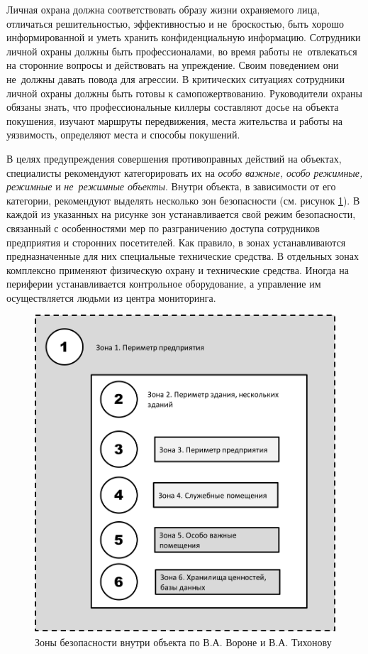 \documentclass[a4paper,12pt,fleqn]{article} %
\begin{document}
Личная охрана должна соответствовать образу жизни охраняемого лица, отличаться решительностью, эффективностью и не~броскостью, быть хорошо информированной и уметь хранить конфиденциальную информацию. Сотрудники личной охраны должны быть профессионалами, во время работы не~отвлекаться на сторонние вопросы и действовать на упреждение. Своим поведением они не~должны давать повода для агрессии. В критических ситуациях сотрудники личной охраны должны быть готовы к самопожертвованию. Руководители охраны обязаны знать, что профессиональные киллеры составляют досье на объекта покушения, изучают маршруты передвижения, места жительства и работы на уязвимость, определяют места и способы покушений.

В целях предупреждения совершения противоправных действий на объектах, специалисты рекомендуют категорировать их на \textit{особо важные, особо режимные, режимные} и \textit{не~режимные объекты}. Внутри объекта, в зависимости от его категории, рекомендуют выделять несколько зон безопасности (см. рисунок \ref{image2}). В каждой из указанных на рисунке зон устанавливается свой режим безопасности, связанный с особенностями мер по разграничению доступа сотрудников предприятия и сторонних посетителей. Как правило, в зонах устанавливаются предназначенные для них специальные технические средства. В отдельных зонах комплексно применяют физическую охрану и технические средства. Иногда на периферии устанавливается контрольное оборудование, а управление им осуществляется людьми из центра мониторинга.

\begin{figure}[h]
	\centering
	\includegraphics[scale=0.6]{img2}
	\caption{Зоны безопасности внутри объекта по В.А. Вороне и В.А. Тихонову}
	\label{image2}
\end{figure}
\end{document}
